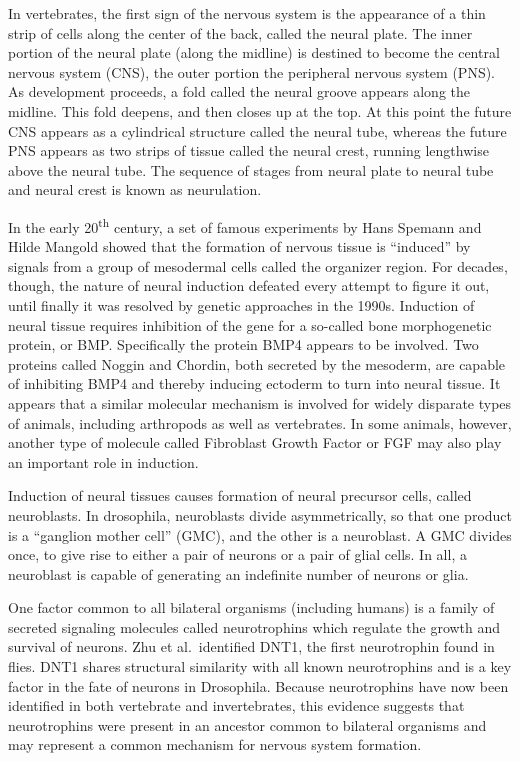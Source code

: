 In vertebrates, the first sign of the nervous system is the appearance of a thin strip of cells along the center of the back, called the neural plate. The inner portion of the neural plate (along the midline) is destined to become the central nervous system (CNS), the outer portion the peripheral nervous system (PNS). As development proceeds, a fold called the neural groove appears along the midline. This fold deepens, and then closes up at the top. At this point the future CNS appears as a cylindrical structure called the neural tube, whereas the future PNS appears as two strips of tissue called the neural crest, running lengthwise above the neural tube. The sequence of stages from neural plate to neural tube and neural crest is known as neurulation.

In the early 20\textsuperscript{th} century, a set of famous experiments by Hans Spemann and Hilde Mangold showed that the formation of nervous tissue is ``induced'' by signals from a group of mesodermal cells called the organizer region. For decades, though, the nature of neural induction defeated every attempt to figure it out, until finally it was resolved by genetic approaches in the 1990s. Induction of neural tissue requires inhibition of the gene for a so-called bone morphogenetic protein, or BMP. Specifically the protein BMP4 appears to be involved. Two proteins called Noggin and Chordin, both secreted by the mesoderm, are capable of inhibiting BMP4 and thereby inducing ectoderm to turn into neural tissue. It appears that a similar molecular mechanism is involved for widely disparate types of animals, including arthropods as well as vertebrates. In some animals, however, another type of molecule called Fibroblast Growth Factor or FGF may also play an important role in induction.

Induction of neural tissues causes formation of neural precursor cells, called neuroblasts. In drosophila, neuroblasts divide asymmetrically, so that one product is a ``ganglion mother cell'' (GMC), and the other is a neuroblast. A GMC divides once, to give rise to either a pair of neurons or a pair of glial cells. In all, a neuroblast is capable of generating an indefinite number of neurons or glia.

One factor common to all bilateral organisms (including humans) is a family of secreted signaling molecules called neurotrophins which regulate the growth and survival of neurons. Zhu et al.~identified DNT1, the first neurotrophin found in flies. DNT1 shares structural similarity with all known neurotrophins and is a key factor in the fate of neurons in Drosophila. Because neurotrophins have now been identified in both vertebrate and invertebrates, this evidence suggests that neurotrophins were present in an ancestor common to bilateral organisms and may represent a common mechanism for nervous system formation.


